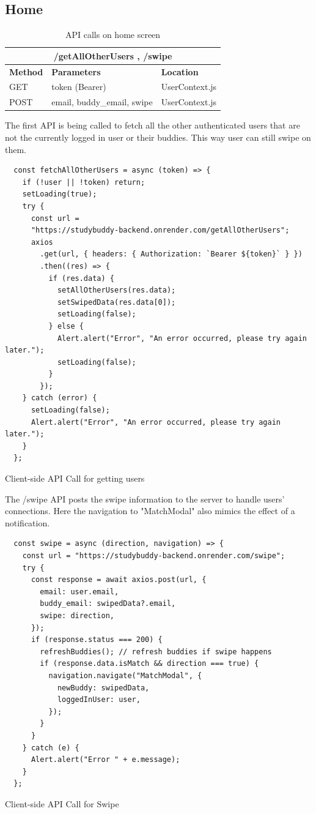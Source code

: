 \subsection{Home}
\begin{table}[H]
	\centering
	\begin{tabular}{ |p{}|p{}|p{}| }
		\hline
            \multicolumn{3}{|c|}{/getAllOtherUsers , /swipe} \\
            \hline
		\textbf{Method} & \textbf{Parameters} & \textbf{Location}\\
            \hline
		  GET & token (Bearer) & UserContext.js\\
            \hline
		  POST & email, buddy\_email, swipe & UserContext.js\\
            \hline
	\end{tabular}
	\caption{API calls on home screen}
	\label{tab:getallotherusers}
\end{table}
The first API is being called to fetch all the other authenticated users that are not the currently logged in user or their buddies. This way user can still swipe on them.
\begin{listing}[H]
\begin{verbatim} 
  const fetchAllOtherUsers = async (token) => {
    if (!user || !token) return;
    setLoading(true);
    try {
      const url = 
      "https://studybuddy-backend.onrender.com/getAllOtherUsers";
      axios
        .get(url, { headers: { Authorization: `Bearer ${token}` } })
        .then((res) => {
          if (res.data) {
            setAllOtherUsers(res.data);
            setSwipedData(res.data[0]);
            setLoading(false);
          } else {
            Alert.alert("Error", "An error occurred, please try again later.");
            setLoading(false);
          }
        });
    } catch (error) {
      setLoading(false);
      Alert.alert("Error", "An error occurred, please try again later.");
    }
  };
\end{verbatim}
\caption{Client-side API Call for getting users}
\label{src:getallotherusers}
\end{listing}
The /swipe API posts the swipe information to the server to handle users' connections. Here the navigation to "MatchModal" also mimics the effect of a notification.
\begin{listing}[H]
\begin{verbatim} 
  const swipe = async (direction, navigation) => {
    const url = "https://studybuddy-backend.onrender.com/swipe";
    try {
      const response = await axios.post(url, {
        email: user.email,
        buddy_email: swipedData?.email,
        swipe: direction,
      });
      if (response.status === 200) {
        refreshBuddies(); // refresh buddies if swipe happens
        if (response.data.isMatch && direction === true) {
          navigation.navigate("MatchModal", {
            newBuddy: swipedData,
            loggedInUser: user,
          });
        }
      }
    } catch (e) {
      Alert.alert("Error " + e.message);
    }
  };
\end{verbatim}
\caption{Client-side API Call for Swipe}
\label{src:getallotherusers}
\end{listing}

